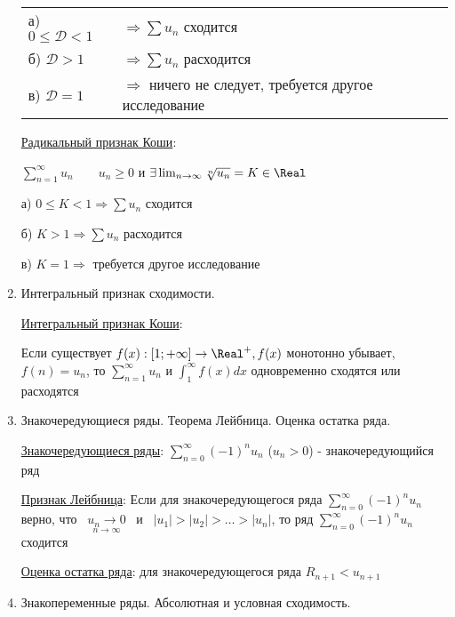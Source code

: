 \begin{enumerate}
    \begin{tabular}{ll}
        а) $0 \leq \mathcal{D} < 1$ & $\Longrightarrow \sum u_n$ сходится                                \\

        б) $\mathcal{D} > 1$        & $\Longrightarrow \sum u_n$ расходится                              \\

        в) $\mathcal{D} = 1$        & $\Longrightarrow$ ничего не следует, требуется другое исследование \\
    \end{tabular}

    \hyperlink{cauchyradicalsign}{Радикальный признак Коши}:

    $\sum_{n = 1}^\infty u_n \quad\quad u_n \geq 0$ и $\exists \lim_{n \to \infty} \sqrt[n]{u_n} = K \in \Real$

    а) $0 \leq K < 1 \Longrightarrow \sum u_n$ сходится

    б) $K > 1 \Longrightarrow \sum u_n$ расходится

    в) $K = 1 \Longrightarrow$ требуется другое исследование

    \item Интегральный признак сходимости.

    \hyperlink{cauchyintegralsign}{Интегральный признак Коши}:

    Если существует $f(x) : [1; +\infty] \to \Real^+, f(x)$ монотонно убывает, $f(n) = u_n$, то $\sum_{n = 1}^\infty u_n$ и $\int_{1}^\infty f(x) dx$ одновременно сходятся или расходятся

    \item Знакочередующиеся ряды. Теорема Лейбница. Оценка остатка ряда.

    \hyperlink{alternatingsignseries}{Знакочередующиеся ряды}: $\sum_{n = 0}^\infty (-1)^n u_n$ ($u_n > 0$) - знакочередующийся ряд

    \hyperlink{leibniztheorem}{Признак Лейбница}: Если для знакочередующегося ряда $\sum_{n = 0}^\infty (-1)^n u_n$ верно,
    что \ $\underset{n \to \infty}{u_n \to 0}$ \ и \ $|u_1| > |u_2| > \dots > |u_n|$,
    то ряд $\sum_{n = 0}^\infty (-1)^n u_n$ сходится

    \hyperlink{seriesremainderevaluation}{Оценка остатка ряда}: для знакочередующегося ряда $R_{n + 1} < u_{n + 1}$

    \item Знакопеременные ряды. Абсолютная и условная сходимость.


\end{enumerate}
